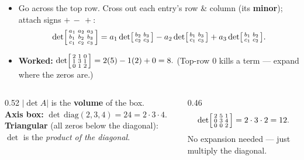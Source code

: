 \documentclass[aspectratio=169, 11pt]{beamer}
\begin{document}
\begin{frame}[t, plain]
  \begin{itemize}
    \setlength{\itemsep}{5pt}
    \item Go across the top row. Cross out each entry's row \& column (its \textbf{minor}); attach signs $+\,-\,+$:
      \[ \det\begin{bsmallmatrix} a_1 & a_2 & a_3\\ b_1 & b_2 & b_3\\ c_1 & c_2 & c_3 \end{bsmallmatrix}
        = a_1\det\begin{bsmallmatrix} b_2 & b_3\\ c_2 & c_3 \end{bsmallmatrix}
        - a_2\det\begin{bsmallmatrix} b_1 & b_3\\ c_1 & c_3 \end{bsmallmatrix}
        + a_3\det\begin{bsmallmatrix} b_1 & b_2\\ c_1 & c_2 \end{bsmallmatrix}. \]
    \item \textbf{Worked:} $\det\begin{bsmallmatrix} 2 & 1 & 0\\ 1 & 3 & 1\\ 0 & 1 & 2 \end{bsmallmatrix}
          = 2(5) - 1(2) + 0 = 8.$ \; (Top-row $0$ kills a term --- expand where the zeros are.)
  \end{itemize}
\end{frame}

\begin{frame}[t, plain]
  \begin{columns}[T]
    \begin{column}{0.52\textwidth}
      $|\det A|$ is the \textbf{volume} of the box.\\[6pt]
      \textbf{Axis box:} $\det\,\mathrm{diag}(2,3,4)=24=2\!\cdot\!3\!\cdot\!4.$\\[6pt]
      \textbf{Triangular} (all zeros below the diagonal): $\det$ is the \emph{product of the diagonal}.
    \end{column}
    \begin{column}{0.46\textwidth}
      \centering
      \[ \det\begin{bsmallmatrix} 2 & 5 & 1\\ 0 & 3 & 4\\ 0 & 0 & 2 \end{bsmallmatrix} = 2\cdot3\cdot2 = 12. \]
      \vspace{4pt}
      No expansion needed --- just multiply the diagonal.
    \end{column}
  \end{columns}
\end{frame}
\end{document}
